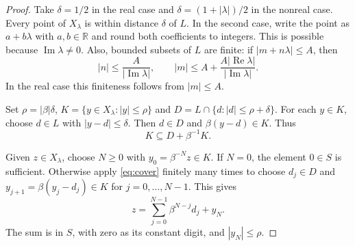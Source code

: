 \documentclass[11pt]{article}
\newcommand{\R}{\mathbb R}
\begin{document}
\begin{proof}
Take $\delta=1/2$ in the real case and
$\delta=(1+|\lambda|)/2$ in the nonreal case. Every point of $X_\lambda$
is within distance $\delta$ of $L$. In the second case, write the point as
$a+b\lambda$ with $a,b\in\R$ and round both coefficients to integers.
This is possible because $\operatorname{Im}\lambda\ne0$.
Also, bounded subsets of $L$ are finite: if $|m+n\lambda|\le A$, then
\[
 |n|\le\frac A{|\operatorname{Im}\lambda|},\qquad
 |m|\le A+\frac{A|\operatorname{Re}\lambda|}{|\operatorname{Im}\lambda|}.
\]
In the real case this finiteness follows from $|m|\le A$.

Set $\rho=|\beta|\delta$,
$K=\{y\in X_\lambda:|y|\le\rho\}$ and
$D=L\cap\{d:|d|\le\rho+\delta\}$. For each $y\in K$, choose $d\in L$
with $|y-d|\le\delta$. Then $d\in D$ and $\beta(y-d)\in K$. Thus
\begin{equation}\label{eq:cover}
 K\subseteq D+\beta^{-1}K.
\end{equation}

Given $z\in X_\lambda$, choose $N\ge0$ with
$y_0=\beta^{-N}z\in K$. If $N=0$, the element $0\in S$ is sufficient.
Otherwise apply \eqref{eq:cover} finitely many times to choose $d_j\in D$
and $y_{j+1}=\beta(y_j-d_j)\in K$ for $j=0,\ldots,N-1$. This gives
\begin{equation}\label{eq:finite-expansion}
 z=\sum_{j=0}^{N-1}\beta^{N-j}d_j+y_N.
\end{equation}
The sum is in $S$, with zero as its constant digit, and $|y_N|\le\rho$.
\end{proof}
\end{document}
